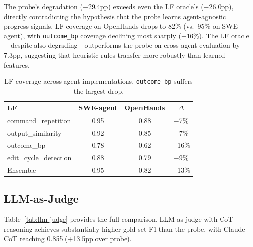 \documentclass[11pt,a4paper]{article}
\begin{document}
The probe's degradation ($-$29.4pp) exceeds even the LF oracle's ($-$26.0pp), directly contradicting the hypothesis that the probe learns agent-agnostic progress signals.
LF coverage on OpenHands drops to 82\% (vs.\ 95\% on SWE-agent), with \texttt{outcome\_bp} coverage declining most sharply ($-$16\%).
The LF oracle---despite also degrading---outperforms the probe on cross-agent evaluation by 7.3pp, suggesting that heuristic rules transfer more robustly than learned features.

\begin{table}[t]
\centering
\small
\begin{tabular}{lccc}
\toprule
\textbf{LF} & \textbf{SWE-agent} & \textbf{OpenHands} & $\Delta$ \\
\midrule
command\_repetition & 0.95 & 0.88 & $-$7\% \\
output\_similarity & 0.92 & 0.85 & $-$7\% \\
outcome\_bp & 0.78 & 0.62 & $-$16\% \\
edit\_cycle\_detection & 0.88 & 0.79 & $-$9\% \\
Ensemble & 0.95 & 0.82 & $-$13\% \\
\bottomrule
\end{tabular}
\caption{LF coverage across agent implementations. \texttt{outcome\_bp} suffers the largest drop.}
\label{tab:lf-coverage}
\end{table}

\subsection{LLM-as-Judge}

Table~\ref{tab:llm-judge} provides the full comparison. LLM-as-judge with CoT reasoning achieves substantially higher gold-set F1 than the probe, with Claude CoT reaching 0.855 ($+$13.5pp over probe).
\end{document}
